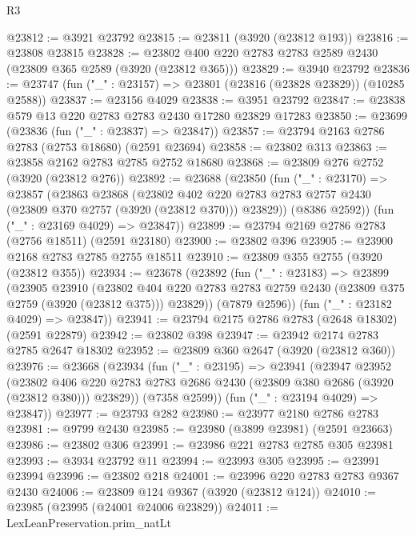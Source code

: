 \begin{lexlean}{R3}
\begin{coremodule}
@23812 := @3921 @23792
@23815 := @23811 (@3920 (@23812 @193))
@23816 := @23808 @23815
@23828 := @23802 @400 @220 @2783 @2783 @2589 @2430 (@23809 @365 @2589 (@3920 (@23812 @365)))
@23829 := @3940 @23792
@23836 := @23747 (fun ("_" : @23157) => @23801 (@23816 (@23828 @23829)) (@10285 @2588))
@23837 := @23156 @4029
@23838 := @3951 @23792
@23847 := @23838 @579 @13 @220 @2783 @2783 @2430 @17280 @23829 @17283
@23850 := @23699 (@23836 (fun ("_" : @23837) => @23847))
@23857 := @23794 @2163 @2786 @2783 (@2753 @18680) (@2591 @23694)
@23858 := @23802 @313
@23863 := @23858 @2162 @2783 @2785 @2752 @18680
@23868 := @23809 @276 @2752 (@3920 (@23812 @276))
@23892 := @23688
    (@23850
      (fun ("_" : @23170) =>
      @23857
        (@23863
          @23868
          (@23802
            @402
            @220
            @2783
            @2783
            @2757
            @2430
            (@23809 @370 @2757 (@3920 (@23812 @370)))
            @23829))
        (@8386 @2592))
      (fun ("_" : @23169 @4029) => @23847))
@23899 := @23794 @2169 @2786 @2783 (@2756 @18511) (@2591 @23180)
@23900 := @23802 @396
@23905 := @23900 @2168 @2783 @2785 @2755 @18511
@23910 := @23809 @355 @2755 (@3920 (@23812 @355))
@23934 := @23678
    (@23892
      (fun ("_" : @23183) =>
      @23899
        (@23905
          @23910
          (@23802
            @404
            @220
            @2783
            @2783
            @2759
            @2430
            (@23809 @375 @2759 (@3920 (@23812 @375)))
            @23829))
        (@7879 @2596))
      (fun ("_" : @23182 @4029) => @23847))
@23941 := @23794 @2175 @2786 @2783 (@2648 @18302) (@2591 @22879)
@23942 := @23802 @398
@23947 := @23942 @2174 @2783 @2785 @2647 @18302
@23952 := @23809 @360 @2647 (@3920 (@23812 @360))
@23976 := @23668
    (@23934
      (fun ("_" : @23195) =>
      @23941
        (@23947
          @23952
          (@23802
            @406
            @220
            @2783
            @2783
            @2686
            @2430
            (@23809 @380 @2686 (@3920 (@23812 @380)))
            @23829))
        (@7358 @2599))
      (fun ("_" : @23194 @4029) => @23847))
@23977 := @23793 @282
@23980 := @23977 @2180 @2786 @2783
@23981 := @9799 @2430
@23985 := @23980 (@3899 @23981) (@2591 @23663)
@23986 := @23802 @306
@23991 := @23986 @221 @2783 @2785 @305 @23981
@23993 := @3934 @23792 @11
@23994 := @23993 @305
@23995 := @23991 @23994
@23996 := @23802 @218
@24001 := @23996 @220 @2783 @2783 @9367 @2430
@24006 := @23809 @124 @9367 (@3920 (@23812 @124))
@24010 := @23985 (@23995 (@24001 @24006 @23829))
@24011 := LexLeanPreservation.prim_natLt

\end{coremodule}
\end{lexlean}
